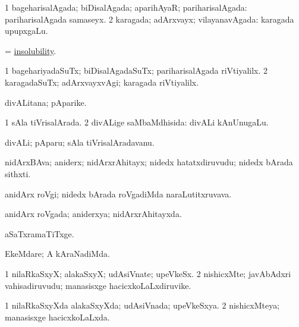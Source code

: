 \bentry
{}
\gl{\gu}
\bmng
\bnum
\num{1} bageharisalAgada; biDisalAgada; aparihAyaR; pariharisalAgada:  pariharisalAgada samaseyx. 
\num{2} karagada; adArxvayx; vilayanavAgada:  karagada upupxgaLu. 
\enum
\emng
\eentry

\bentry
{}
\gl{\nA}
\bmng
=  \hyperlink{insolubility}{insolubility}. 
\emng
\eentry

\bentry
{}
\gl{\kirxvi}
\bmng
\bnum
\num{1} bagehariyadaSuTx; biDisalAgadaSuTx; pariharisalAgada riVtiyalilx. 
\num{2} karagadaSuTx; adArxvayxvAgi; karagada riVtiyalilx. 
\enum
\emng
\eentry

\bentry
{}
\gl{\nA}
\bmng
divALitana; pAparike. 
\emng
\eentry

\bentry
{}
\gl{\gu}
\bmng
\bnum
\num{1} sAla tiVrisalArada. 
\num{2} divALige saMbaMdhisida:  divALi kAnUnugaLu. 
\enum
\emng
\eentry

\bentry
{}
\gl{\nA}
\bmng
divALi; pAparu; sAla tiVrisalAradavanu. 
\emng
\eentry

\bentry
{}
\gl{\nA}
\bmng
nidArxBAva; aniderx; nidArxrAhitayx; nidedx hatatxdiruvudu; nidedx bArada sithxti. 
\emng
\eentry

\bentry
{}
\gl{\nA}
\bmng
anidArx roVgi; nidedx bArada roVgadiMda naraLutitxruvava. 
\emng
\eentry

\bentry
{}
\gl{\gu}
\bmng
anidArx roVgada; aniderxya; nidArxrAhitayxda. 
\emng
\eentry

\bentry
{}
\gl{\kirxvi}
\bmng
aSaTxramaTiTxge. 
\emng

\noindent
\gl{\nuga}
\bmng
{} EkeMdare; A kAraNadiMda. 
\emng
\eentry

\bentry
{}
\gl{\nA}
\bmng
\bnum
\num{1} nilaRkaSxyX; alakaSxyX; udAsiVnate; upeVkeSx. 
\num{2} nishicxMte; javAbAdxri vahisadiruvudu; manasisxge hacicxkoLaLxdiruvike. 
\enum
\emng
\eentry

\bentry
{}
\gl{\gu}
\bmng
\bnum
\num{1} nilaRkaSxyXda alakaSxyXda; udAsiVnada; upeVkeSxya. 
\num{2} nishicxMteya; manasisxge hacicxkoLaLxda. 
\enum
\emng
\eentry

